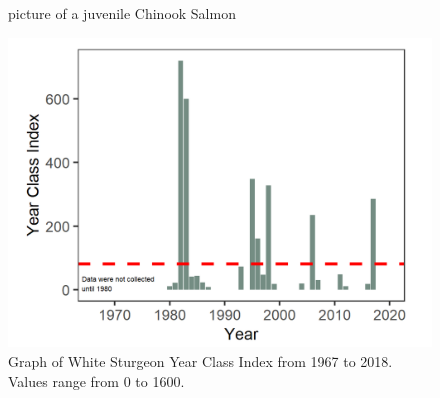 \documentclass[
]{book}
\begin{document}
\begin{panel-grid}
\begin{columns-nocenter}
\begin{column800}
\begin{figure}
{}

\caption{picture of a juvenile Chinook Salmon}\label{fig:unnamed-chunk-172}
\end{figure}

\end{column800}

\end{columns-nocenter}

\begin{columns-nocenter}

\begin{column800}

\begin{expand}

\begin{figure}
\includegraphics[width=15.25in]{figures/whistu_plot_allYears} \caption{Graph of White Sturgeon Year Class Index from 1967 to 2018. Values range from 0 to 1600.}\label{fig:unnamed-chunk-173}
\end{figure}

\end{expand}

\end{column800}

\begin{column40}

~

\end{column40}

\begin{column800}

\begin{expand}


\end{expand}
\end{column800}
\end{columns-nocenter}
\end{panel-grid}
\end{document}
